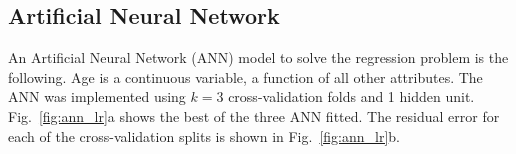\documentclass[10pt, paper=a4]{article}
\begin{document}

\subsection{Artificial Neural Network}
An Artificial Neural Network (ANN) model to solve the regression
problem is the following.  Age is a continuous variable, a function of
all other attributes.  The ANN was implemented using $k=3$
cross-validation folds and 1 hidden unit.  Fig.~\ref{fig:ann_lr}a
shows the best of the three ANN fitted.  The residual error for each
of the cross-validation splits is shown in Fig.~\ref{fig:ann_lr}b.

\end{document}
